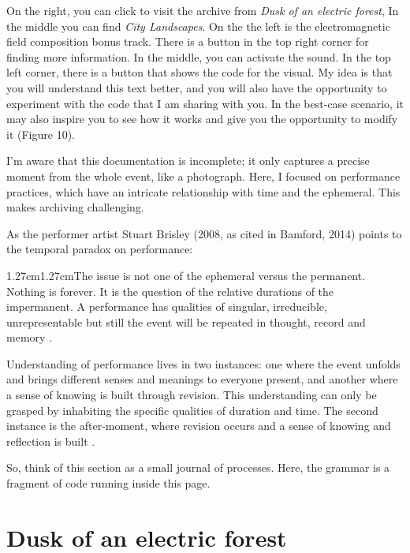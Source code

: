 \documentclass[12pt, twoside, a4paper]{report}
\begin{document}
On the right, you can click to visit the archive from \textit{Dusk of an electric forest}, 
In the middle you can find \textit{City Landscapes}. On the the left is the electromagnetic field composition bonus track.
There is a button in the top right corner for finding more information. 
In the middle, you can activate the sound. In the top left corner, 
there is a button that shows the code for the visual. My idea is that you will understand this text better,
and you will also have the opportunity to experiment with the code that I am sharing with you. In the best-case scenario, it may also inspire you to see how it works and give you the opportunity to modify it (Figure 10).


I’m aware that this documentation is incomplete; it only captures a precise moment from the whole event, like a photograph. Here, I focused on performance practices, which have an intricate relationship with time and the ephemeral. This makes archiving challenging.

As the performer artist Stuart Brisley (2008, as cited in Bamford, 2014) points to the temporal paradox on performance:
 \begin{adjustwidth}{1.27cm}{1.27cm}The issue is not one of the ephemeral versus the permanent. Nothing is forever. 
 It is the question of the relative durations of the impermanent.
 A performance has qualities of singular, irreducible, unrepresentable 
 but still the event will be repeated in thought, record and memory \citep{bamford2014working}.
 \end{adjustwidth}

Understanding of performance lives in two instances:
 one where the event unfolds and brings different senses and meanings to everyone present, and another where a sense of knowing is built through revision. This understanding can only be grasped by inhabiting the specific qualities of duration and time. The second instance is the after-moment, where revision occurs and a sense of knowing and reflection is built \citep{performrepeat}.

So, think of this section as a small journal of processes. Here, the grammar is a fragment of code running inside this page. 



\section{Dusk of an electric forest}
\vspace{.5cm}
\end{document}
